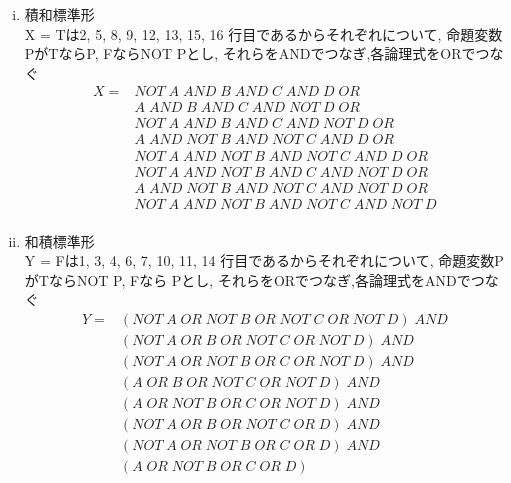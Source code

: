 \documentclass[dvipdfmx,10pt, a4j]{jarticle}
\theoremstyle{definition}
\begin{document}
    \begin{enumerate}[i)]
        \item 積和標準形\\
        X = Tは2, 5, 8, 9, 12, 13, 15, 16 行目であるからそれぞれについて, 命題変数PがTならP, FならNOT \; Pとし, それらをANDでつなぎ,各論理式をORでつなぐ\\
        \begin{align*}
            X = &NOT\; A\; AND\; B\; AND\; C\; AND\; D\; OR\\
            &A\; AND\; B\; AND\; C\; AND\; NOT\; D\; OR\\
            &NOT\; A\; AND\; B\; AND\; C\; AND\; NOT\; D\; OR\\
            &A\; AND\; NOT\; B\; AND\; NOT\; C\; AND\; D\; OR\\
            &NOT\; A\; AND\; NOT\; B\; AND\; NOT\; C\; AND\; D\; OR\\
            &NOT\; A\; AND\; NOT\; B\; AND\; C\; AND\; NOT\; D\; OR\\
            &A\; AND\; NOT\; B\; AND\; NOT\; C\; AND\; NOT\; D\; OR\\
            &NOT\; A\; AND\; NOT\; B\; AND\; NOT\; C\; AND\; NOT\; D\\
        \end{align*}
        \item 和積標準形\\
        Y = Fは1, 3, 4, 6, 7, 10, 11, 14 行目であるからそれぞれについて, 命題変数PがTならNOT \; P, Fなら Pとし, それらをORでつなぎ,各論理式をANDでつなぐ\\
        \begin{align*}
            Y = & (NOT\; A\; OR\; NOT\; B\; OR\; NOT\; C\; OR\; NOT\; D) \; AND\\
            & (NOT\; A\; OR\; B\; OR\; NOT\; C\; OR\; NOT\; D)\; AND\\
            & (NOT\; A\; OR\; NOT\; B\; OR\; C\; OR\; NOT\; D)\; AND\\
            & (A\; OR\; B\; OR\; NOT\; C\; OR\; NOT\; D)\; AND\\
            & (A\; OR\; NOT\; B\; OR\; C\; OR\; NOT\; D)\; AND\\
            & (NOT\; A\; OR\; B\; OR\; NOT\; C\; OR\; D)\; AND\\
            & (NOT\; A\; OR\; NOT\; B\; OR\; C\; OR\; D)\; AND\\
            & (A\; OR\; NOT\; B\; OR\; C\; OR\; D)\\
        \end{align*}

\end{enumerate}
\end{document}
